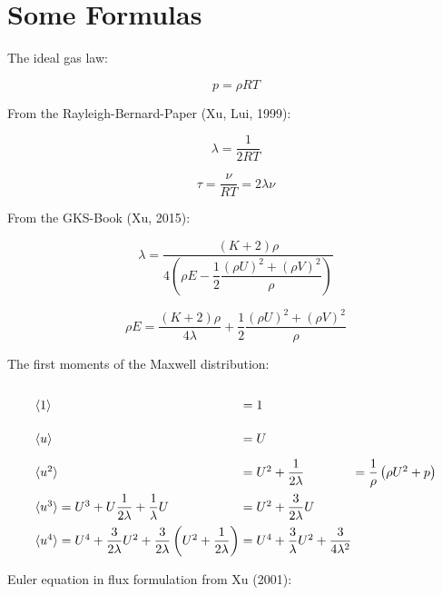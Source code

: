 \documentclass[
	pdftex,             %
	12pt,				%
	a4paper,		   	%
	english,				%
	oneside,			%
]{article}
\newcommand{\mom}[1]{\langle #1 \rangle}
\begin{document}
\clearpage

\section{Some Formulas}

The ideal gas law:

\begin{equation}
p = \rho RT
\end{equation}

From the Rayleigh-Bernard-Paper (Xu, Lui, 1999):

\begin{equation}
\lambda = \frac{1}{2RT}
\end{equation}

\begin{equation}
\tau = \frac{\nu}{RT} = 2\lambda\nu
\end{equation}

From the GKS-Book (Xu, 2015):

\begin{equation}
\lambda =\frac{(K+2)\rho}
{4\left( \rho E - \dfrac{1}{2} \dfrac{(\rho U)^2 + (\rho V)^2}{\rho}  \right)}
\end{equation}

\begin{equation}
\rho E = \dfrac{(K+2)\rho}{4\lambda} + \dfrac{1}{2} \dfrac{(\rho U)^2 + (\rho V)^2}{\rho}
\end{equation}

The first moments of the Maxwell distribution:

\begin{equation}
\arraycolsep=1.4pt\def\arraystretch{2.2}
\begin{array}{lcll}
\mom{1} &=& 1 &\\
\mom{u} &=& U &\\
\mom{u^2} &=& U^2 + \dfrac{1}{2\lambda} & = \dfrac{1}{\rho} \left( \rho U^2 + p \right) \\
\mom{u^3} = U^3 + U\dfrac{1}{2\lambda} + \dfrac{1}{\lambda} U &=& U^2 + \dfrac{3}{2\lambda} U &\\
\mom{u^4} = U^4 + \dfrac{3}{2\lambda} U^2 + \dfrac{3}{2\lambda} \left(U^2 + \dfrac{1}{2\lambda} \right)
		  &=& U^4 + \dfrac{3}{\lambda} U^2 + \dfrac{3}{4\lambda^2}&
\end{array}
\end{equation}

Euler equation in flux formulation from Xu (2001):
\end{document}

